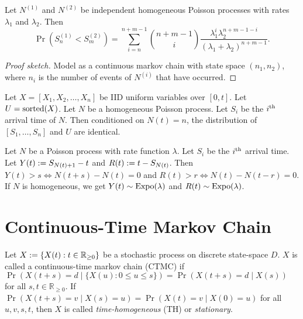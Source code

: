 \documentclass[a4paper, 12pt, fleqn]{article}
\DeclareMathOperator{\Expo}{\opname{Expo}}
\begin{document}
\begin{lemma}
Let $N^{(1)}$ and $N^{(2)}$ be independent homogeneous Poisson processes
with rates $\lambda_1$ and $\lambda_2$. Then
\[ \Pr(S^{(1)}_n < S^{(2)}_m) = \sum_{i=n}^{n+m-1} \binom{n+m-1}{i}
    \frac{\lambda_1^i\lambda_2^{n+m-1-i}}{(\lambda_1 + \lambda_2)^{n+m-1}}. \]
\end{lemma}
\begin{proof}[Proof sketch]
Model as a continuous markov chain with state space $(n_1, n_2)$,
where $n_i$ is the number of events of $N^{(i)}$ that have occurred.
\end{proof}

\begin{theorem}
Let $X = [X_1, X_2, \ldots, X_n]$ be IID uniform variables over $[0, t]$.
Let $U = \operatorname{sorted}(X)$. Let $N$ be a homogeneous Poisson process.
Let $S_i$ be the $i^{\textrm{th}}$ arrival time of $N$.
Then conditioned on $N(t) = n$, the distribution of $[S_1, \ldots, S_n]$ and $U$ are identical.
\end{theorem}

\begin{lemma}
Let $N$ be a Poisson process with rate function $\lambda$.
Let $S_i$ be the $i^{\textrm{th}}$ arrival time.
Let $Y(t) := S_{N(t)+1}-t$ and $R(t) := t - S_{N(t)}$.
Then $Y(t) > s \iff N(t+s)-N(t) = 0$ and $R(t) > r \iff N(t)-N(t-r) = 0$.
If $N$ is homogeneous, we get $Y(t) \sim \Expo(\lambda)$ and $R(t) \sim \Expo(\lambda)$.
\end{lemma}

\section{Continuous-Time Markov Chain}

\begin{definition}[CTMC]
Let $X := \{X(t): t \in \mathbb{R}_{\ge 0}\}$ be a stochastic process
on discrete state-space $D$.
$X$ is called a continuous-time markov chain (CTMC) if
$\Pr(X(t+s) = d \mid \{X(u): 0 \le u \le s\}) = \Pr(X(t+s)=d \mid X(s))$
for all $s, t \in \mathbb{R}_{\ge 0}$.
If $\Pr(X(t+s)=v \mid X(s)=u) = \Pr(X(t)=v \mid X(0)=u)$ for all $u, v, s, t$,
then $X$ is called \emph{time-homogeneous} (TH) or \emph{stationary}.
\end{definition}
\end{document}
